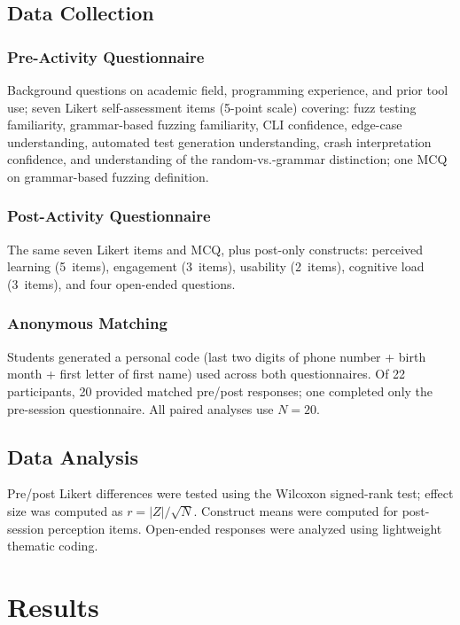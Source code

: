 \documentclass[conference]{IEEEtran}
\begin{document}
\subsection{Data Collection}

\subsubsection{Pre-Activity Questionnaire}
Background questions on academic field, programming experience, and prior tool use; seven Likert self-assessment items (5-point scale) covering: fuzz testing familiarity, grammar-based fuzzing familiarity, CLI confidence, edge-case understanding, automated test generation understanding, crash interpretation confidence, and understanding of the random-vs.-grammar distinction; one MCQ on grammar-based fuzzing definition.

\subsubsection{Post-Activity Questionnaire}
The same seven Likert items and MCQ, plus post-only constructs: perceived learning (5~items), engagement (3~items), usability (2~items), cognitive load (3~items), and four open-ended questions.

\subsubsection{Anonymous Matching}
Students generated a personal code (last two digits of phone number + birth month + first letter of first name) used across both questionnaires.
Of 22 participants, 20 provided matched pre/post responses; one completed only the pre-session questionnaire.
All paired analyses use $N = 20$.

\subsection{Data Analysis}

Pre/post Likert differences were tested using the Wilcoxon signed-rank test; effect size was computed as $r = |Z|/\sqrt{N}$.
Construct means were computed for post-session perception items.
Open-ended responses were analyzed using lightweight thematic coding.

\section{Results}
\label{sec:results}
\end{document}
